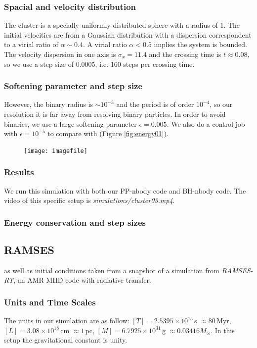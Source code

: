 \subsubsection*{Spacial and velocity distribution}
The cluster is a specially uniformly distributed sphere with a radius of 1. The initial 
velocities are from a  Gaussian distribution with a dispersion correspondent to a virial ratio 
of $ \alpha \sim 0.4 $. A virial ratio $ \alpha < 0.5 $ implies the system is bounded. The 
velocity dispersion in one axis is $ \sigma_x = 11.4 $ and the crossing time is $ t \approx 
0.08 $, so we use a step size of 0.0005, i.e. 160 steps per crossing time.

\subsubsection*{Softening parameter and step size}
However, the binary radius is $ \sim 10^{-3} $ and the period is of order $ 10^{-4} $, so our 
resolution it is far away from resolving binary particles. In order to avoid binaries, we use 
a large softening parameter $ \epsilon = 0.005 $. We also do a control job with $ \epsilon 
= 10^{-5} $ to compare with (Figure \ref{fig:energy01}).
\begin{figure}
	\centering
	\texttt{[image: imagefile]}
\end{figure}

\subsubsection*{Results}
We run this simulation with both our PP-nbody code and BH-nbody code. 
The video of this specific setup is \textit{simulations/cluster03.mp4}.

\subsubsection*{Energy conservation and step sizes}

\subsection{RAMSES}
as well as initial conditions taken 
from a snapshot of a simulation from \textit{RAMSES-RT}, an AMR MHD code with 
radiative transfer.

\subsubsection*{Units and Time Scales}
The units in our simulation are as follow: $ [T] = 2.5395 \times 10^{15}\,$s $\approx 
80\,$Myr, 
$ [L] = 3.08 \times 10^{18} \, $cm $ \approx 1 \, $pc, $ [M] = 6.7925 \times 10^{31} \, $g $ 
\approx 0.03416 M_\odot $. In this setup the gravitational constant is unity. 

